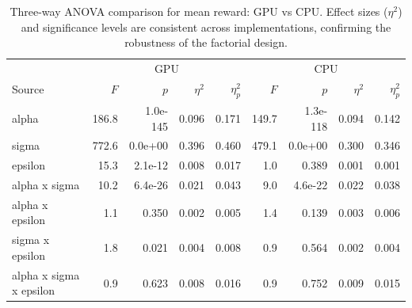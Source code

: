 \begin{table}[htbp]
\centering
\caption{Three-way ANOVA comparison for mean reward: GPU vs CPU. Effect sizes ($\eta^2$) and significance levels are consistent across implementations, confirming the robustness of the factorial design.}
\label{tab:anova-comparison}
\begin{tabular}{l|rrrr|rrrr}
\toprule
 & \multicolumn{4}{c|}{GPU} & \multicolumn{4}{c}{CPU} \\
Source & $F$ & $p$ & $\eta^2$ & $\eta^2_p$ & $F$ & $p$ & $\eta^2$ & $\eta^2_p$ \\
\midrule
alpha & 186.8 & 1.0e-145 & 0.096 & 0.171 & 149.7 & 1.3e-118 & 0.094 & 0.142 \\
sigma & 772.6 & 0.0e+00 & 0.396 & 0.460 & 479.1 & 0.0e+00 & 0.300 & 0.346 \\
epsilon & 15.3 & 2.1e-12 & 0.008 & 0.017 & 1.0 & 0.389 & 0.001 & 0.001 \\
alpha x sigma & 10.2 & 6.4e-26 & 0.021 & 0.043 & 9.0 & 4.6e-22 & 0.022 & 0.038 \\
alpha x epsilon & 1.1 & 0.350 & 0.002 & 0.005 & 1.4 & 0.139 & 0.003 & 0.006 \\
sigma x epsilon & 1.8 & 0.021 & 0.004 & 0.008 & 0.9 & 0.564 & 0.002 & 0.004 \\
alpha x sigma x epsilon & 0.9 & 0.623 & 0.008 & 0.016 & 0.9 & 0.752 & 0.009 & 0.015 \\
\bottomrule
\end{tabular}
\end{table}